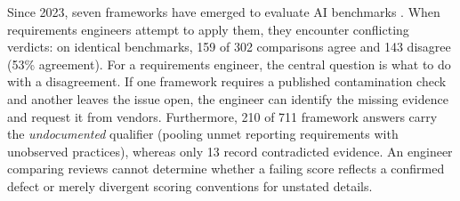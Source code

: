 \documentclass[runningheads]{llncs}
\begin{document}
Since 2023, seven frameworks have emerged to evaluate AI benchmarks \cite{reuel_betterbench,liu_ecbd_2024,san_joaquin_scorecard_2026,cao_how2bench_2025,zhu_agentic_benchmark_checklist_2025,corona_benchmark_caliper_2026,cohn_hernandez_orallo_oecd_2023}. When requirements engineers attempt to apply them, they encounter conflicting verdicts: on identical benchmarks, 159 of 302 comparisons agree and 143 disagree (53\% agreement). For a requirements engineer, the central question is what to do with a disagreement. If one framework requires a published contamination check and another leaves the issue open, the engineer can identify the missing evidence and request it from vendors. Furthermore, 210 of 711 framework answers carry the \emph{undocumented} qualifier (pooling unmet reporting requirements with unobserved practices), whereas only 13 record contradicted evidence. An engineer comparing reviews cannot determine whether a failing score reflects a confirmed defect or merely divergent scoring conventions for unstated details.
\end{document}
